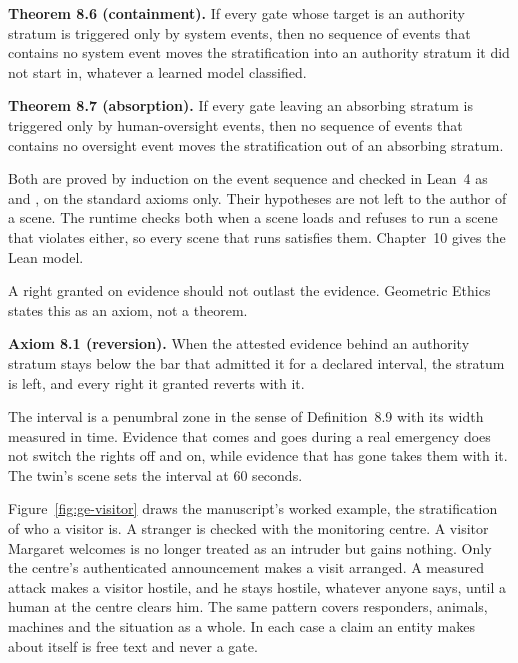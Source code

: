 \medskip\noindent\textbf{Theorem 8.6 (containment).} If every gate whose target is an authority
stratum is triggered only by system events, then no sequence of events that contains no system
event moves the stratification into an authority stratum it did not start in, whatever a learned
model classified.

\medskip\noindent\textbf{Theorem 8.7 (absorption).} If every gate leaving an absorbing stratum is
triggered only by human-oversight events, then no sequence of events that contains no oversight
event moves the stratification out of an absorbing stratum.

\medskip\noindent Both are proved by induction on the event sequence and checked in Lean~4 as
 and , on the standard axioms only.
Their hypotheses are not left to the author of a scene. The runtime checks both when a scene
loads and refuses to run a scene that violates either, so every scene that runs satisfies them.
Chapter~10 gives the Lean model.

A right granted on evidence should not outlast the evidence. Geometric Ethics states this as an
axiom, not a theorem.

\medskip\noindent\textbf{Axiom 8.1 (reversion).} When the attested evidence behind an authority
stratum stays below the bar that admitted it for a declared interval, the stratum is left, and
every right it granted reverts with it.

\medskip\noindent The interval is a penumbral zone in the sense of Definition~8.9 with its width
measured in time. Evidence that comes and goes during a real emergency does not switch the rights
off and on, while evidence that has gone takes them with it.
The twin's scene sets the interval at 60 seconds.

Figure~\ref{fig:ge-visitor} draws the manuscript's worked example, the stratification of who a
visitor is. A stranger is checked with the monitoring centre. A visitor Margaret welcomes is no
longer treated as an intruder but gains nothing. Only the centre's authenticated announcement makes
a visit arranged. A measured attack makes a visitor hostile, and he stays hostile, whatever anyone
says, until a human at the centre clears him.
The same pattern covers responders, animals, machines and the situation as a whole. In each case
a claim an entity makes about itself is free text and never a gate.

